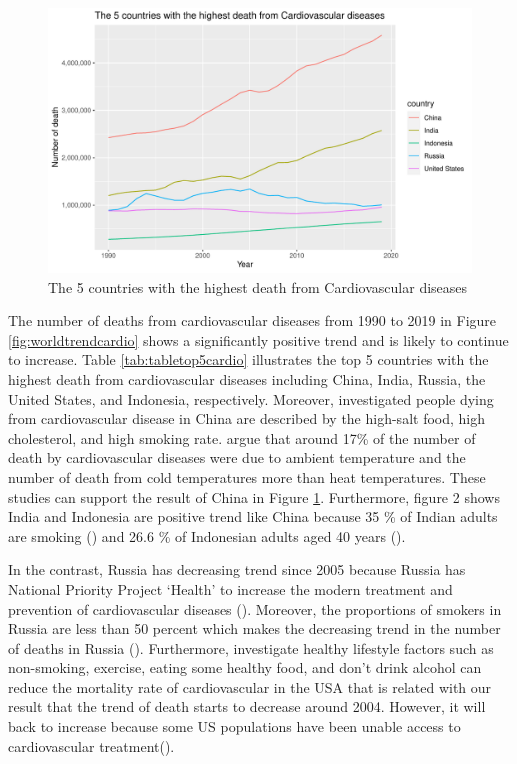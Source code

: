 \documentclass[11pt,a4paper,]{article}
\begin{document}
\begin{figure}[H]

{\centering \includegraphics[width=0.8\linewidth]{report_files/figure-latex/graphtop5cardio-1} 

}

\caption{The 5 countries with the highest death from Cardiovascular diseases}\label{fig:graphtop5cardio}
\end{figure}

The number of deaths from cardiovascular diseases from 1990 to 2019 in Figure \ref{fig:worldtrendcardio} shows a significantly positive trend and is likely to continue to increase. Table \ref{tab:tabletop5cardio} illustrates the top 5 countries with the highest death from cardiovascular diseases including China, India, Russia, the United States, and Indonesia, respectively. Moreover, \textcite{zhang_2021_healthy} investigated people dying from cardiovascular disease in China are described by the high-salt food, high cholesterol, and high smoking rate. \textcite{yang_2015_cardiovascular} argue that around 17\% of the number of death by cardiovascular diseases were due to ambient temperature and the number of death from cold temperatures more than heat temperatures. These studies can support the result of China in Figure \ref{fig:graphtop5cardio}.
Furthermore, figure 2 shows India and Indonesia are positive trend like China because 35 \% of Indian adults are smoking (\textcite{prabhakaran_2016_cardiovascular}) and 26.6 \% of Indonesian adults aged 40 years (\textcite{maharani_2019_cardiovascular}).

In the contrast, Russia has decreasing trend since 2005 because Russia has National Priority Project `Health' to increase the modern treatment and prevention of cardiovascular diseases (\textcite{pogosova_2016_positive}). Moreover, the proportions of smokers in Russia are less than 50 percent which makes the decreasing trend in the number of deaths in Russia (\textcite{lakunchykova_2020_why}). Furthermore, \textcite{zhang_2021_healthy} investigate healthy lifestyle factors such as non-smoking, exercise, eating some healthy food, and don't drink alcohol can reduce the mortality rate of cardiovascular in the USA that is related with our result that the trend of death starts to decrease around 2004. However, it will back to increase because some US populations have been unable access to cardiovascular treatment(\textcite{mensah_2017_decline}).
\end{document}
